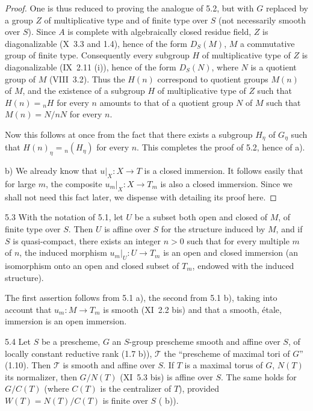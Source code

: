 \begin{proof}
One is thus reduced to proving the analogue of 5.2, but with $G$ replaced by a group $Z$ of multiplicative type and of finite type over $S$ (not necessarily smooth over $S$). Since $A$ is complete with algebraically closed residue field, $Z$ is diagonalizable (X~3.3 and 1.4), hence of the form $D_S(M)$, $M$ a commutative group of finite type. Consequently every subgroup $H$ of multiplicative type of $Z$ is diagonalizable (IX~2.11 (i)), hence of the form $D_S(N)$, where $N$ is a quotient group of $M$ (VIII~3.2). Thus the $H(n)$ correspond to quotient groups $M(n)$ of $M$, and the existence of a subgroup $H$ of multiplicative type of $Z$ such that $H(n)={}_nH$ for every $n$ amounts to that of a quotient group $N$ of $M$ such that $M(n)=N/nN$ for every $n$.

Now this follows at once from the fact that there exists a subgroup $H_\eta$ of $G_\eta$ such that $H(n)_\eta={}_n(H_\eta)$ for every $n$. This completes the proof of 5.2, hence of a).

b) We already know that $u|_X:X\to T$ is a closed immersion. It follows easily that for large $m$, the composite $u_m|_X:X\to T_m$ is also a closed immersion. Since we shall not need this fact later, we dispense with detailing its proof here.
\end{proof}
\begin{corollary}{5.3}\label{XII.5.3}
With the notation of 5.1, let $U$ be a subset both open and closed of $M$, of finite type over $S$. Then $U$ is affine over $S$ for the structure induced by $M$, and if $S$ is quasi-compact, there exists an integer $n>0$ such that for every multiple $m$ of $n$, the induced morphism $u_m|_U:U\to T_m$ is an open and closed immersion (\ie an isomorphism onto an open and closed subset of $T_m$, endowed with the induced structure).
\end{corollary}
The first assertion follows from 5.1 a), the second from 5.1 b), taking into account that $u_m:M\to T_m$ is smooth (XI~2.2 bis) and that a smooth, \ie étale, immersion is an open immersion.
\begin{corollary}{5.4}\label{XII.5.4}
Let $S$ be a prescheme, $G$ an $S$-group prescheme smooth and affine over $S$, of locally constant reductive rank (1.7 b)), $\mathscr T$ the ``prescheme of maximal tori of $G$'' (1.10). Then $\mathscr T$ is smooth and affine over $S$. If $T$ is a maximal torus of $G$, $N(T)$ its normalizer, then $G/N(T)$ (XI~5.3 bis) is affine over $S$. The same holds for $G/C(T)$ (where $C(T)$ is the centralizer of $T$), provided $W(T)=N(T)/C(T)$ is finite over $S$ ( b)).
\end{corollary}
